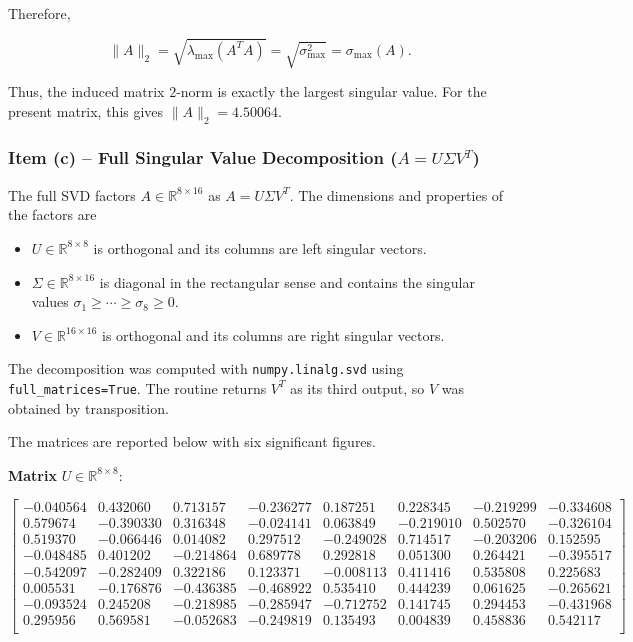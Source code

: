 Therefore,

\begin{equation}
    \|A\|_2
    =\sqrt{\lambda_{\max}(A^TA)}
    =\sqrt{\sigma_{\max}^2}
    =\sigma_{\max}(A).
\end{equation}

Thus, the induced matrix $2$-norm is exactly the largest singular value. For the present matrix, this gives $\|A\|_2=4.50064$.

\subsubsection*{Item (c) -- Full Singular Value Decomposition ($A=U\Sigma V^T$)}

The full SVD factors $A\in\mathbb{R}^{8\times16}$ as
$A=U\Sigma V^T$. The dimensions and properties of the factors are

\begin{itemize}
    \item $U\in\mathbb{R}^{8\times8}$ is orthogonal and its columns are left singular vectors.
    \item $\Sigma\in\mathbb{R}^{8\times16}$ is diagonal in the rectangular sense and contains the singular values
    $\sigma_1\geq\cdots\geq\sigma_8\geq0$.
    \item $V\in\mathbb{R}^{16\times16}$ is orthogonal and its columns are right singular vectors.
\end{itemize}

The decomposition was computed with \texttt{numpy.linalg.svd} using \texttt{full\_matrices=True}. The routine returns $V^T$ as its third output, so $V$ was obtained by transposition.

The matrices are reported below with six significant figures.

\textbf{Matrix } $U\in\mathbb{R}^{8\times8}$:

\begingroup
\setlength{\arraycolsep}{3pt}
\renewcommand{\arraystretch}{0.85}
\small
\begin{equation*}
\begin{bmatrix}
-0.040564 & 0.432060 & 0.713157 & -0.236277 & 0.187251 & 0.228345 & -0.219299 & -0.334608 \\
0.579674 & -0.390330 & 0.316348 & -0.024141 & 0.063849 & -0.219010 & 0.502570 & -0.326104 \\
0.519370 & -0.066446 & 0.014082 & 0.297512 & -0.249028 & 0.714517 & -0.203206 & 0.152595 \\
-0.048485 & 0.401202 & -0.214864 & 0.689778 & 0.292818 & 0.051300 & 0.264421 & -0.395517 \\
-0.542097 & -0.282409 & 0.322186 & 0.123371 & -0.008113 & 0.411416 & 0.535808 & 0.225683 \\
0.005531 & -0.176876 & -0.436385 & -0.468922 & 0.535410 & 0.444239 & 0.061625 & -0.265621 \\
-0.093524 & 0.245208 & -0.218985 & -0.285947 & -0.712752 & 0.141745 & 0.294453 & -0.431968 \\
0.295956 & 0.569581 & -0.052683 & -0.249819 & 0.135493 & 0.004839 & 0.458836 & 0.542117 \\
\end{bmatrix}
\end{equation*}
\endgroup

